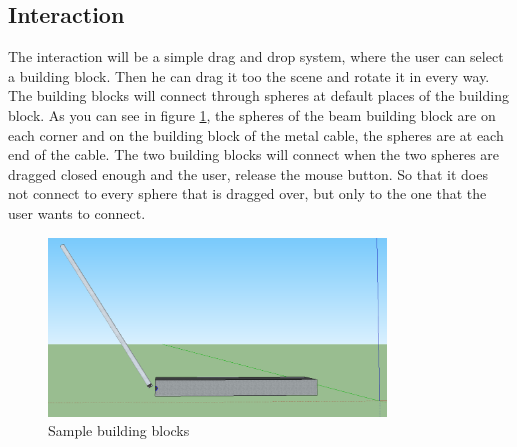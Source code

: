 \subsection{Interaction}
The interaction will be a simple drag and drop system, where the user can select a building block. Then he can drag it too the scene and rotate it in every way. The building blocks will connect through spheres at default places of the building block. As you can see in figure \ref{fig:sbb}, the spheres of the beam building block are on each corner and on the building block of the metal cable, the spheres are at each end of the cable. The two building blocks will connect when the two spheres are dragged closed enough and the user, release the mouse button. So that it does not connect to every sphere that is dragged over, but only to the one that the user wants to connect. 
\begin{figure}[H]
    \centering
    \includegraphics[width=0.8\textwidth]{pics/Spheresbuildingblocks.png}
    \caption{Sample building blocks}
    \label{fig:sbb}
\end{figure}

